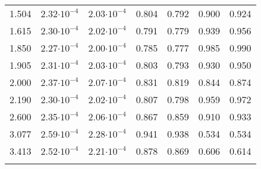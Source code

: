 \documentclass[agp]{svjour}
\begin{document}
\begin{appendix}
\begin{table}
\begin{tabular*}{84.22mm}{@{\hspace{0pt}\extracolsep{-.8pt}}ccccccc@{\hspace{0pt}}}
1.504 & 2.32$\cdot 10^{-4}$ & 2.03$\cdot 10^{-4}$ & 0.804 & 0.792 & 0.900 & 0.924 \\
1.615 & 2.30$\cdot 10^{-4}$ & 2.02$\cdot 10^{-4}$ & 0.791 & 0.779 & 0.939 & 0.956 \\
1.850 & 2.27$\cdot 10^{-4}$ & 2.00$\cdot 10^{-4}$ & 0.785 & 0.777 & 0.985 & 0.990 \\
1.905 & 2.31$\cdot 10^{-4}$ & 2.03$\cdot 10^{-4}$ & 0.803 & 0.793 & 0.930 & 0.950 \\
2.000 & 2.37$\cdot 10^{-4}$ & 2.07$\cdot 10^{-4}$ & 0.831 & 0.819 & 0.844 & 0.874 \\
2.190 & 2.30$\cdot 10^{-4}$ & 2.02$\cdot 10^{-4}$ & 0.807 & 0.798 & 0.959 & 0.972 \\
2.600 & 2.35$\cdot 10^{-4}$ & 2.06$\cdot 10^{-4}$ & 0.867 & 0.859 & 0.910 & 0.933 \\
3.077 & 2.59$\cdot 10^{-4}$ & 2.28$\cdot 10^{-4}$ & 0.941 & 0.938 & 0.534 & 0.534 \\
3.413 & 2.52$\cdot 10^{-4}$ & 2.21$\cdot 10^{-4}$ & 0.878 & 0.869 & 0.606 & 0.614 \\
\noalign{\smallskip}
\hline
\end{tabular*}
\label{tab:7}
\end{table}


\end{appendix}
\end{document}
